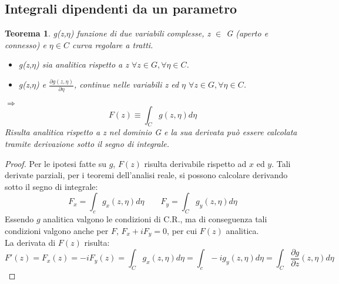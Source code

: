 \documentclass[twoside]{article}
\newtheorem{theorem}{Teorema}[section]
\begin{document}
\subsection{Integrali dipendenti da un parametro}
\begin{theorem}\label{int par}
g(z,$\eta$) funzione di due variabili complesse, z $\in$ G (aperto e connesso) e $\eta\in C$ curva regolare a tratti.
\begin{itemize}
    \item g(z,$\eta$) sia analitica rispetto a z $\forall z \in G, \forall \eta \in C$.
    \item g(z,$\eta$) e $\frac{\partial g(z,\eta)}{\partial \eta}$, continue nelle variabili z ed $\eta$ $\forall z \in G, \forall \eta \in C$.
\end{itemize}
$\Longrightarrow$
\begin{equation}
    F(z)\equiv \int_Cg(z,\eta)d\eta
\end{equation}
Risulta analitica rispetto a z nel dominio G e la sua derivata può essere calcolata tramite derivazione sotto il segno di integrale.\\
\end{theorem}
\begin{proof}
Per le ipotesi fatte su $g$, $F(z)$ risulta derivabile rispetto ad $x$ ed $y$. Tali derivate parziali, per i teoremi dell'analisi reale, si possono calcolare derivando sotto il segno di integrale:
\begin{equation}
    F_x=\int_cg_x(z,\eta)d\eta \qquad F_y=\int_C g_y (z,\eta)d\eta
\end{equation}
Essendo $g$ analitica valgono le condizioni di C.R., ma di conseguenza tali condizioni valgono anche per $F$, $F_x+iF_y=0$, per cui $F(z)$ analitica.\\
La derivata di $F(z)$ risulta:
\begin{equation}
    F'(z)=F_x(z)=-iF_y(z)=\int_Cg_x(z,\eta)d\eta=\int_c-ig_y(z,\eta)d\eta=\int_C\frac{\partial g}{\partial z}(z,\eta)d\eta
\end{equation}
\end{proof}
\end{document}
